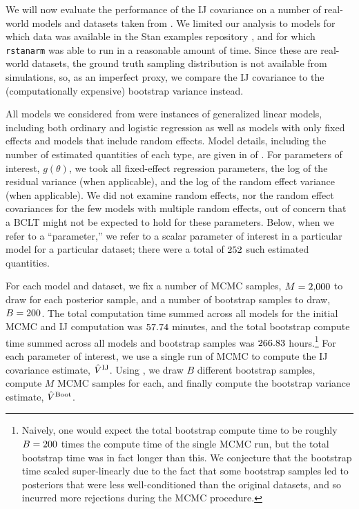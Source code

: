 
We will now evaluate the performance of the IJ covariance on a number of
real-world models and datasets taken from \citet{gelman:2006:arm}.  We limited
our analysis to models for which data was available in the Stan examples
repository \citep{stan-examples:2017}, and for which \texttt{rstanarm}
\citep{rstanarm} was able to run in a reasonable amount of time. Since these are
real-world datasets, the ground truth sampling distribution is not available
from simulations, so, as an imperfect proxy, we compare the IJ covariance to the
(computationally expensive) bootstrap variance instead.

All models we considered from \citet{gelman:2006:arm} were instances of
generalized linear models, including both ordinary and logistic regression as
well as models with only fixed effects and models that include random effects.
Model details, including the number of estimated quantities of each type, are
given in  of .  For
parameters of interest, $g(\theta)$, we took all fixed-effect regression
parameters, the log of the residual variance (when applicable), and the log of
the random effect variance (when applicable). We did not examine random effects,
nor the random effect covariances for the few models with multiple random
effects, out of concern that a BCLT might not be expected to hold for these
parameters.  Below, when we refer to a ``parameter,'' we refer to a scalar
parameter of interest in a particular model for a particular dataset; there were
a total of $252$ such estimated quantities.

For each model and dataset, we fix a number of MCMC samples, $M =
2{,}000$ to draw for each posterior sample, and a number of
bootstrap samples to draw, $B = 200$. The total computation time
summed across all models for the initial MCMC and IJ computation was
$57.74$ minutes, and the total bootstrap compute time summed
across all models and bootstrap samples was $266.83$
hours.\footnote{Naively, one would expect the total bootstrap compute time to be
roughly $B = 200$ times the compute time of the single MCMC run,
but the total bootstrap time was in fact longer than this. We conjecture that
the bootstrap time scaled super-linearly due to the fact that some bootstrap
samples led to posteriors that were less well-conditioned than the original
datasets, and so incurred more rejections during the MCMC procedure.}
%
For each parameter of interest, we use a single run of MCMC
to compute the IJ covariance estimate, $\hat{V}^{\mathrm{IJ}}$.  Using , we
draw $B$ different bootstrap samples, compute $M$ MCMC samples for each, and
finally compute the bootstrap variance estimate, $\hat{V}^{\mathrm{Boot}}$.

